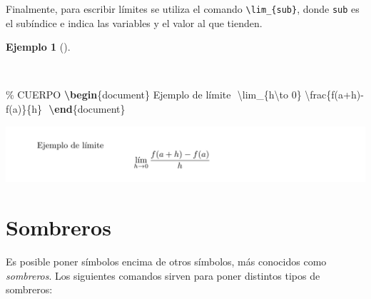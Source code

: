 \documentclass[
  a4paper,
]{scrreport}
\newenvironment{Shaded}{\begin{snugshade}}{\end{snugshade}}
\newcommand{\CommentTok}[1]{\textcolor[rgb]{0.37,0.37,0.37}{#1}}
\newcommand{\ExtensionTok}[1]{\textcolor[rgb]{0.00,0.23,0.31}{#1}}
\newcommand{\KeywordTok}[1]{\textcolor[rgb]{0.00,0.23,0.31}{\textbf{#1}}}
\newcommand{\NormalTok}[1]{\textcolor[rgb]{0.00,0.23,0.31}{#1}}
\newcommand{\SpecialCharTok}[1]{\textcolor[rgb]{0.37,0.37,0.37}{#1}}
\newcommand{\SpecialStringTok}[1]{\textcolor[rgb]{0.13,0.47,0.30}{#1}}
\theoremstyle{definition}
\newtheorem{example}{Ejemplo}[chapter]
\theoremstyle{remark}
\begin{document}
Finalmente, para escribir límites se utiliza el comando
\texttt{\textbackslash{}lim\_\{sub\}}, donde \texttt{sub} es el
subíndice e indica las variables y el valor al que tienden.

\begin{example}[]\protect\hypertarget{exm-limites}{}\label{exm-limites}

~

\begin{Shaded}
\begin{Highlighting}[]
\CommentTok{\% CUERPO}
\KeywordTok{\textbackslash{}begin}\NormalTok{\{}\ExtensionTok{document}\NormalTok{\}}
\NormalTok{Ejemplo de límite}
\SpecialStringTok{$$}
\SpecialCharTok{\textbackslash{}lim}\SpecialStringTok{\_\{h}\SpecialCharTok{\textbackslash{}to}\SpecialStringTok{ 0\} }\SpecialCharTok{\textbackslash{}frac}\SpecialStringTok{\{f(a+h){-}f(a)\}\{h\}}
\SpecialStringTok{$$}
\KeywordTok{\textbackslash{}end}\NormalTok{\{}\ExtensionTok{document}\NormalTok{\}}
\end{Highlighting}
\end{Shaded}

\begin{tcolorbox}[enhanced jigsaw, colframe=quarto-callout-note-color-frame, opacityback=0, title={Salida}, bottomrule=.15mm, left=2mm, coltitle=black, arc=.35mm, leftrule=.75mm, colback=white, rightrule=.15mm, colbacktitle=quarto-callout-note-color!10!white, toprule=.15mm, breakable, opacitybacktitle=0.6, bottomtitle=1mm, toptitle=1mm, titlerule=0mm]

\includegraphics{img/formulas/limite.png}

\end{tcolorbox}

\end{example}

\section{Sombreros}\label{sombreros}

Es posible poner símbolos encima de otros símbolos, más conocidos como
\emph{sombreros}. Los siguientes comandos sirven para poner distintos
tipos de sombreros:
\end{document}
